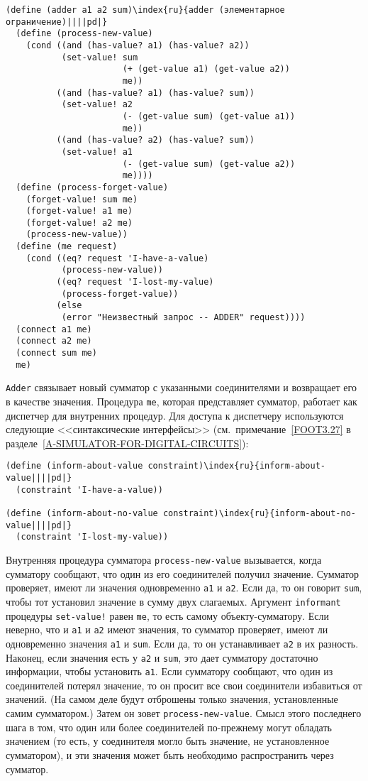 \begin{Verbatim}[fontsize=\small]
(define (adder a1 a2 sum)\index{ru}{adder (элементарное ограничение)||||pd|}
  (define (process-new-value)
    (cond ((and (has-value? a1) (has-value? a2))
           (set-value! sum
                       (+ (get-value a1) (get-value a2))
                       me))
          ((and (has-value? a1) (has-value? sum))
           (set-value! a2
                       (- (get-value sum) (get-value a1))
                       me))
          ((and (has-value? a2) (has-value? sum))
           (set-value! a1
                       (- (get-value sum) (get-value a2))
                       me))))
  (define (process-forget-value)
    (forget-value! sum me)
    (forget-value! a1 me)
    (forget-value! a2 me)
    (process-new-value))
  (define (me request)
    (cond ((eq? request 'I-have-a-value)
           (process-new-value))
          ((eq? request 'I-lost-my-value)
           (process-forget-value))
          (else
           (error "Неизвестный запрос -- ADDER" request))))
  (connect a1 me)
  (connect a2 me)
  (connect sum me)
  me)
\end{Verbatim}
{\tt Adder} связывает новый сумматор с указанными соединителями
и возвращает его в качестве значения.  Процедура {\tt me},
которая представляет сумматор, работает как диспетчер для внутренних
процедур.  Для доступа к диспетчеру используются следующие
<<синтаксические интерфейсы>> (см.~примечание~\ref{FOOT3.27} в
разделе~\ref{A-SIMULATOR-FOR-DIGITAL-CIRCUITS}):

\begin{Verbatim}[fontsize=\small]
(define (inform-about-value constraint)\index{ru}{inform-about-value||||pd|}
  (constraint 'I-have-a-value))

(define (inform-about-no-value constraint)\index{ru}{inform-about-no-value||||pd|}
  (constraint 'I-lost-my-value))
\end{Verbatim}
Внутренняя процедура сумматора {\tt process-new-value}
вызывается, когда сумматору сообщают, что один из его соединителей
получил значение. Сумматор проверяет, имеют ли значения одновременно
{\tt a1} и {\tt a2}. Если да, то он говорит
{\tt sum}, чтобы тот установил значение в сумму двух
слагаемых.  Аргумент {\tt informant} процедуры
{\tt set-value!} равен {\tt me}, то есть самому
объекту-сумматору.  Если неверно, что и {\tt a1} и
{\tt a2} имеют
значения, то сумматор проверяет, имеют ли одновременно
значения {\tt a1} и {\tt sum}. Если да, то он
устанавливает {\tt a2} в их разность.  Наконец, если значения
есть у {\tt a2} и {\tt sum}, это дает сумматору
достаточно информации, чтобы установить {\tt a1}.  Если
сумматору сообщают, что один из соединителей потерял значение, то он
просит все свои соединители избавиться от значений.  (На самом деле
будут отброшены только значения, установленные самим сумматором.)  Затем
он зовет {\tt process-new-value}. Смысл этого последнего шага
в том, что один или более соединителей по-прежнему могут обладать
значением (то есть, у соединителя могло быть значение, не установленное
сумматором), и эти значения может быть необходимо распространить через
сумматор.

